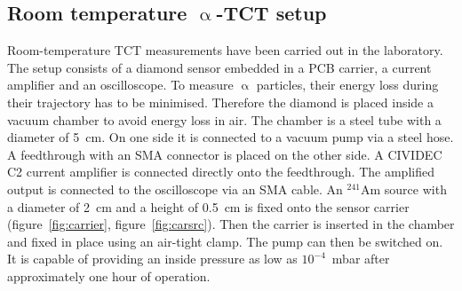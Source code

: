 \subsection{Room temperature $\upalpha$-TCT setup}
Room-temperature TCT measurements have been carried out in the laboratory. The setup consists of a diamond sensor embedded in a PCB carrier, a current amplifier and an oscilloscope. To measure $\upalpha$ particles, their energy loss during their trajectory has to be minimised. Therefore the diamond is placed inside a vacuum chamber to avoid energy loss in air. The chamber is a steel tube with a diameter of 5~cm. On one side it is connected to a vacuum pump via a steel hose. A feedthrough with an SMA connector is placed on the other side. A CIVIDEC C2 current amplifier is connected directly onto the feedthrough. The amplified output is connected to the oscilloscope via an SMA cable. An $^{241}$Am source with a diameter of 2~cm and a height of 0.5~cm is fixed onto the sensor carrier (figure~\ref{fig:carrier}, figure~\ref{fig:carsrc}). Then the carrier is inserted in the chamber and fixed in place using an air-tight clamp. The pump can then be switched on. It is capable of providing an inside pressure as low as $10^{-4}$~mbar after approximately one hour of operation.

